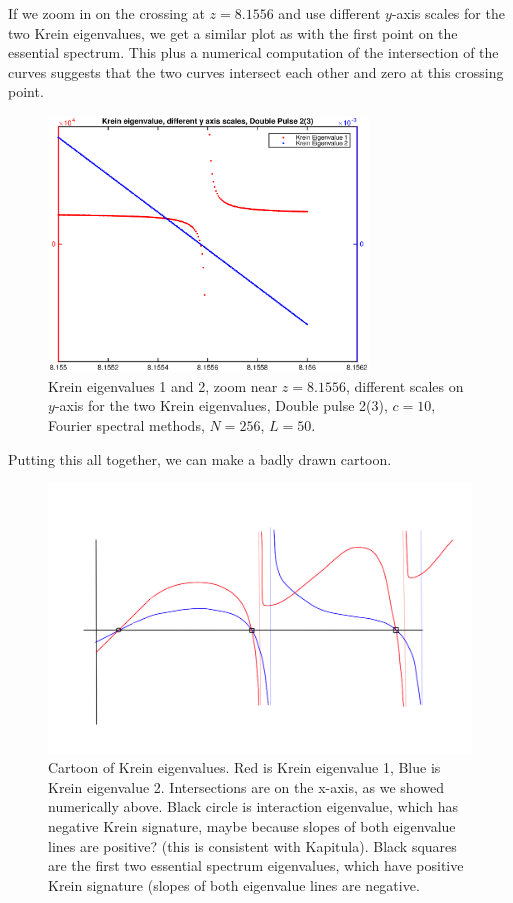 \documentclass[12pt]{article}
\begin{document}
If we zoom in on the crossing at $z = 8.1556$ and use different $y$-axis scales for the two Krein eigenvalues, we get a similar plot as with the first point on the essential spectrum. This plus a numerical computation of the intersection of the curves suggests that the two curves intersect each other and zero at this crossing point.

\begin{figure}[H]
	\includegraphics[width=8.5cm]{dp2kreineigsingnear8diffy.eps}
	\caption{Krein eigenvalues 1 and 2, zoom near $z = 8.1556$, different scales on $y$-axis for the two Krein eigenvalues, Double pulse 2(3), $c = 10$, Fourier spectral methods, $N = 256$, $L = 50$. }
\end{figure}

Putting this all together, we can make a badly drawn cartoon.

\begin{figure}[H]
	\includegraphics[width=15cm]{kreineigcartoon3.png}
	\caption{Cartoon of Krein eigenvalues. Red is Krein eigenvalue 1, Blue is Krein eigenvalue 2. Intersections are on the x-axis, as we showed numerically above. Black circle is interaction eigenvalue, which has negative Krein signature, maybe because slopes of both eigenvalue lines are positive? (this is consistent with Kapitula). Black squares are the first two essential spectrum eigenvalues, which have positive Krein signature (slopes of both eigenvalue lines are negative.}
\end{figure}
\end{document}
